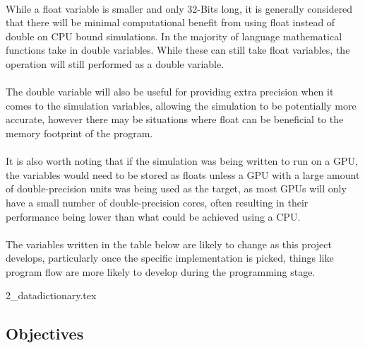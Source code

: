 \paragraph{} 
While a float variable is smaller and only 32-Bits long, it is generally considered that there will be minimal computational benefit from using float instead of double on CPU bound simulations. In the majority of language mathematical functions take in double variables. While these can still take float variables, the operation will still performed as a double variable.

\paragraph{}
The double variable will also be useful for providing extra precision when it comes to the simulation variables, allowing the simulation to be potentially more accurate, however there may be situations where float can be beneficial to the memory footprint of the program.

\paragraph{}
It is also worth noting that if the simulation was being written to run on a GPU, the variables would need to be stored as floats unless a GPU with a large amount of double-precision units was being used as the target, as most GPUs will only have a small number of double-precision cores, often resulting in their performance being lower than what could be achieved using a CPU.

\paragraph{}
The variables written in the table below are likely to change as this project develops, particularly once the specific implementation is picked, things like program flow are more likely to develop during the programming stage.

{2_datadictionary.tex}

\pagebreak

\subsection{Objectives}

